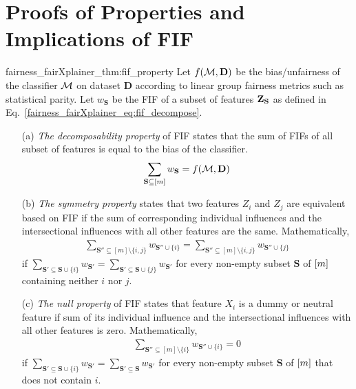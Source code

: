 \section{Proofs of Properties and Implications of FIF}
\begin{reptheorem}{fairness_fairXplainer_thm:fif_property}
	Let $ f(\mathcal{M}, \mathbf{D}) $ be the bias/unfairness of the classifier $ \mathcal{M} $ on dataset $ \mathbf{D} $ according to linear group fairness metrics such as statistical parity. Let $ w_{\mathbf{S}}  $ be the FIF of a subset of  features $ \mathbf{Z}_{\mathbf{S}} $ as defined in Eq.~\eqref{fairness_fairXplainer_eq:fif_decompose}. 
	\begin{enumerate}
		\item[(a)] \textit{The decomposability property} of FIF states that the sum of FIFs of all subset of  features is equal to the bias of the classifier. 
		\begin{align}
		\sum_{\mathbf{S} \subseteq [m] } w_{\mathbf{S}} = f(\mathcal{M}, \mathbf{D})
		\end{align}
		\item[(b)] \textit{The symmetry property} states that  two features $ Z_i $ and $ Z_j $ are equivalent based on FIF if the sum of corresponding individual influences and the intersectional influences with all other features are the same. Mathematically,
		\begin{align}
		\sum_{\mathbf{S}'' \subseteq [m]\setminus \{i,j\}}w_{\mathbf{S}''\cup \{i\}} = \sum_{\mathbf{S}'' \subseteq [m]\setminus\{i,j\}}w_{\mathbf{S}''\cup \{j\}}  
		\end{align}
		if $\sum_{\mathbf{S}' \subseteq \mathbf{S}\cup \{i\}} w_{\mathbf{S}'} = 		\sum_{\mathbf{S}' \subseteq \mathbf{S} \cup \{j\}} w_{\mathbf{S}'}$ for every non-empty subset $ \mathbf{S} $ of $ [m] $ containing neither $ i $ nor $ j $. 
		\item[(c)] \textit{The null property} of FIF states that feature $ X_i $ is a dummy or neutral feature if sum of its individual influence and the intersectional influences with all other features is zero. Mathematically,
		\begin{align}
		\sum_{\mathbf{S}'' \subseteq [m]\setminus\{i\}}w_{\mathbf{S}''\cup \{i\}} = 0 	 
		\end{align}
		if	$\sum_{\mathbf{S}' \subseteq \mathbf{S} \cup \{i\}} w_{\mathbf{S}'} = 		\sum_{\mathbf{S}' \subseteq \mathbf{S}} w_{\mathbf{S}'}$ for every non-empty subset $ \mathbf{S} $ of $ [m] $ that does not contain $ i $.
	\end{enumerate}
\end{reptheorem}



